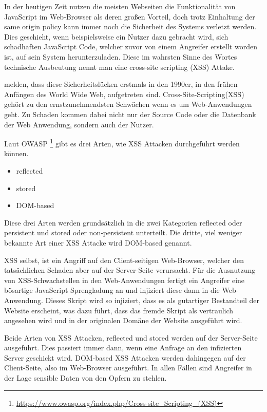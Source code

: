 In der heutigen Zeit nutzen die meisten Webseiten die Funktionalität von JavaScript im Web-Browser als deren großen Vorteil, doch trotz Einhaltung der same origin policy kann immer noch die Sicherheit des Systems verletzt werden. Dies geschieht, wenn beispielsweise ein Nutzer dazu gebracht wird, sich schadhaften JavaScript Code, welcher zuvor von einem Angreifer erstellt worden ist, auf sein System herunterzuladen. Diese im wahrsten Sinne des Wortes technische Ausbeutung nennt man eine cross-site scripting (XSS) Attake.\autocite[2]{kirda2009}


\textcite[2]{hydara2015a} melden, dass diese Sicherheitslücken erstmals in den 1990er, in den frühen Anfängen des World Wide Web, aufgetreten sind. Cross-Site-Scripting(XSS) gehört zu den ernstzunehmendsten Schwächen wenn es um Web-Anwendungen geht. Zu Schaden kommen dabei nicht nur der Source Code oder die Datenbank der Web Anwendung, sondern auch der Nutzer.

Laut OWASP \footnote{\url{https://www.owasp.org/index.php/Cross-site_Scripting_(XSS)}} gibt es drei Arten, wie XSS Attacken durchgeführt werden können.
\begin{itemize}
	\item reflected
	\item stored
	\item DOM-based
\end{itemize}
Diese drei Arten werden grundsätzlich in die zwei Kategorien reflected oder persistent und stored oder non-persistent unterteilt. Die dritte, viel weniger bekannte Art einer XSS Attacke wird DOM-based genannt.


XSS selbst, ist ein Angriff auf den Client-seitigen Web-Browser, welcher den tatsächlichen Schaden aber auf der Server-Seite verursacht. Für die Ausnutzung von XSS-Schwachstellen in den Web-Anwendungen fertigt ein Angreifer eine bösartige JavaScript Sprengladung an und injiziert diese dann in die Web-Anwendung. Dieses Skript wird so injiziert, dass es als gutartiger Bestandteil der Website erscheint, was dazu führt, dass das fremde Skript als vertraulich angesehen wird und in der originalen Domäne der Website ausgeführt wird.\autocite[5]{gupta2017}


Beide Arten von XSS Attacken, reflected und stored werden auf der Server-Seite ausgeführt. Dies passiert immer dann, wenn eine Anfrage an den infizierten Server geschickt wird. DOM-based XSS Attacken werden dahingegen auf der Client-Seite, also im Web-Browser ausgeführt. In allen Fällen sind Angreifer in der Lage sensible Daten von den Opfern zu stehlen.\autocite[2]{hydara2015a}

